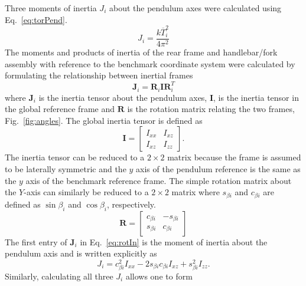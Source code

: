 \documentclass{bmd2010p}
\begin{document}
Three moments of inertia $J_{i}$ about the pendulum axes were calculated using
Eq.~\ref{eq:torPend}.
\begin{equation}
	J_i=\frac{k\overline{T}_i^2}{4\pi^2}
\label{eq:torPend}
\end{equation}
The moments and products of inertia of the rear frame and handlebar/fork
assembly with reference to the benchmark coordinate system were calculated by
formulating the relationship between inertial frames
\begin{equation}
	\mathbf{J}_i=\mathbf{R}_i\mathbf{IR}_i^T
\label{eq:rotIn}
\end{equation}
where $\mathbf{J}_i$ is the inertia tensor about the pendulum axes,
$\mathbf{I}$, is the inertia tensor in the global reference frame and
$\mathbf{R}$ is the rotation matrix relating the two frames,
Fig.~\ref{fig:angles}. The global inertia
tensor is defined as
\begin{equation}
	\mathbf{I}=
	\left[
	\begin{array}{rr}
		I_{xx}  & I_{xz}\\
		I_{xz} & I_{zz}
	\end{array}
	\right]\textrm{.}
	\label{eq:MoI}
\end{equation}
The inertia tensor can be reduced to a $2\times2$ matrix because the frame is
assumed to be laterally symmetric and the $y$ axis of the pendulum reference is
the same as the $y$ axis of the benchmark reference frame. The simple rotation
matrix about the $Y$-axis
can similarly be reduced to a $2\times2$ matrix where $s_{\beta i}$ and
$c_{\beta i}$ are defined as $\sin{\beta_i}$ and $\cos{\beta_i}$,
respectively.
\begin{equation}
	\mathbf{R}=
	\left[
	\begin{array}{rr}
		c_{\beta i} & -s_{\beta i}\\
		s_{\beta i} & c_{\beta i}
	\end{array}
	\right]
	\label{eq:rotMat}
\end{equation}
The first entry of $\mathbf{J}_i$ in Eq.~\ref{eq:rotIn} is the moment of
inertia about the pendulum axis and is written explicitly as
\begin{equation}
	J_{i}=c^{2}_{\beta i}I_{xx}-2s_{\beta i}c_{\beta i}I_{xz}+s^{2}_{\beta i}I_{zz}\textrm{.}
\label{eq:inRelComp}
\end{equation}
Similarly, calculating all three $J_{i}$ allows one to form
\end{document}

